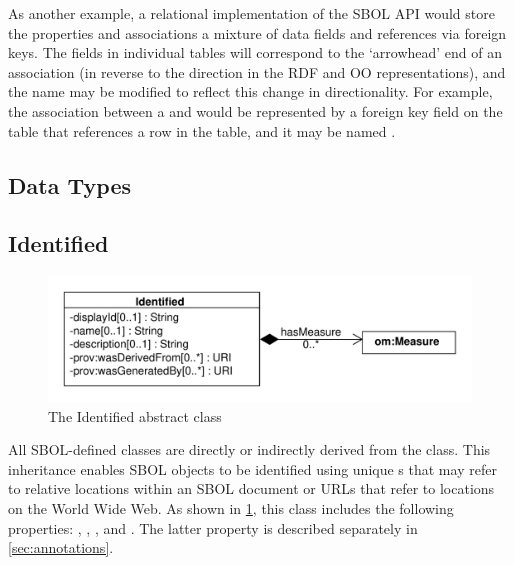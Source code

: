 As another example, a relational implementation of the SBOL API would store the properties and associations a mixture of data fields and references via foreign keys. The fields in individual tables will correspond to the `arrowhead' end of an association (in reverse to the direction in the RDF and OO representations), and the name may be modified to reflect this change in directionality. For example, the  association between a  and  would be represented by a foreign key field on the  table that references a row in the  table, and it may be named .

\subsection{Data Types}


\subsection {Identified}
\label{sec:Identified}

\begin{figure}[ht]
\begin{center}
\includegraphics[scale=0.6]{uml/identified}
\caption[]{The Identified abstract class}
\label{uml:identified}
\end{center}
\end{figure}

All SBOL-defined classes are directly or indirectly derived from the   class. This inheritance enables SBOL objects to be identified using unique s that may refer to relative locations within an SBOL document or URLs that refer to locations on the World Wide Web. As shown in \ref{uml:identified}, this class includes the following properties: , ,  , and . The latter property is described separately in \ref{sec:annotations}.

